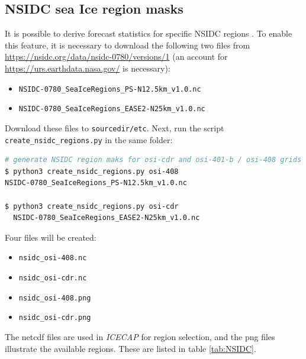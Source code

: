 \documentclass[DIV=10, parskip=full]{scrreprt}
\newcommand{\ice}{\textit{ICECAP}\xspace}
\begin{document}
\subsection{NSIDC sea Ice region masks}
\label{sec:nsidc}
It is possible to derive forecast statistics for specific NSIDC regions \citep{Meier2023}. To enable this feature, it is necessary to download the following two files from \url{https://nsidc.org/data/nsidc-0780/versions/1} (an account for \url{https://urs.earthdata.nasa.gov/} is necessary):
\begin{itemize}
	\item \texttt{NSIDC-0780\_SeaIceRegions\_PS-N12.5km\_v1.0.nc} 
	\item  \texttt{NSIDC-0780\_SeaIceRegions\_EASE2-N25km\_v1.0.nc} 
\end{itemize}

Download these files to \texttt{sourcedir/etc}. Next, run the script \texttt{create\_nsidc\_regions.py} in the same folder:

\begin{lstlisting}[language=bash]
# generate NSIDC region maks for osi-cdr and osi-401-b / osi-408 grids
$ python3 create_nsidc_regions.py osi-408
NSIDC-0780_SeaIceRegions_PS-N12.5km_v1.0.nc

$ python3 create_nsidc_regions.py osi-cdr
  NSIDC-0780_SeaIceRegions_EASE2-N25km_v1.0.nc

\end{lstlisting}

Four files will be created:
\begin{itemize}
	\item \texttt{nsidc\_osi-408.nc}
	\item \texttt{nsidc\_osi-cdr.nc}
	\item \texttt{nsidc\_osi-408.png}
	\item \texttt{nsidc\_osi-cdr.png}
\end{itemize}

The netcdf files are used in \ice for region selection, and the png files illustrate the available regions. These are listed in table \ref{tab:NSIDC}.  \\
\end{document}
